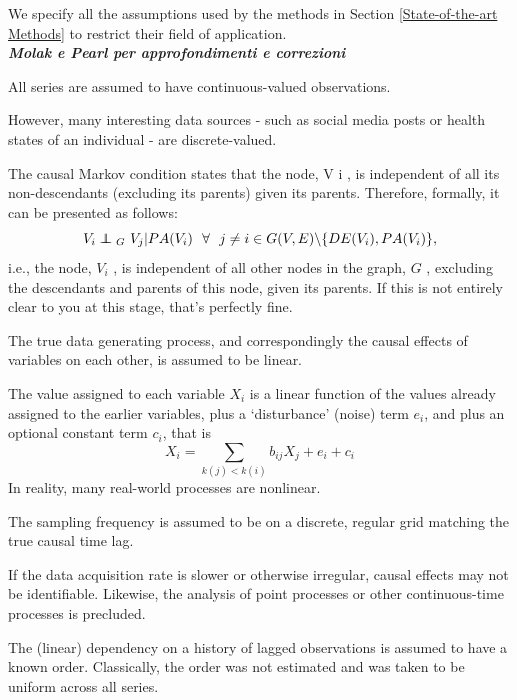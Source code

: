 We specify all the assumptions used by the methods in Section \ref{State-of-the-art Methods} to restrict their field of application.\\

\textbf{\textit{Molak e Pearl per approfondimenti e correzioni}}\\

\begin{definition}
    All series are assumed to have continuous-valued observations.
\end{definition}
However, many interesting data sources - such as social media posts or health states of an individual - are discrete-valued.
\begin{definition}
    The causal Markov condition states that the node, V i , is independent of all its non-descendants (excluding its parents) given its parents. Therefore, formally, it can be presented as follows: $$V_i \independent_G \ V_j | PA(V_i) \ \  \forall \ \ j \neq i \in G(V, E) \symbol{92} \{ DE(V_i), PA(V_i) \}, $$ i.e., the node, $V_i$ , is independent of all other nodes in the graph, $G$ , excluding the descendants and parents of this node, given its parents. If this is not entirely clear to you at this stage, that’s perfectly fine.
\end{definition}
\begin{definition}[Linearity]
    The true data generating process, and correspondingly the causal effects of variables on each other, is assumed to be linear.
\end{definition}
 The value assigned to each variable $X_i$ is a linear function of the values already assigned to the earlier variables, plus a ‘disturbance’ (noise) term $e_i$, and plus an optional constant term $c_i$, that is $$X_i = \sum_{k(j)<k(i)} b_{ij}X_j + e_i + c_i$$
In reality, many real-world processes are nonlinear.
\begin{definition} 
The sampling frequency is assumed to be on a discrete, regular grid matching the true causal time lag.
\end{definition}
If the data acquisition rate is slower or otherwise irregular, causal effects may not be identifiable. Likewise, the analysis of point processes or other continuous-time processes is precluded.
\begin{definition}
    The (linear) dependency on a history of lagged observations is assumed to have a known order. Classically, the order was not estimated and was taken to be uniform across all series.
\end{definition}
